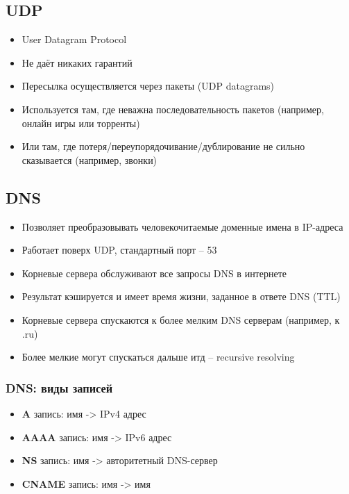   \subsection{UDP}
    \begin{itemize}
      \item User Datagram Protocol
      \item Не даёт никаких гарантий
      \item Пересылка осуществляется через пакеты (UDP datagrams)
      \item Используется там, где неважна последовательность пакетов (например, онлайн игры или торренты)
      \item Или там, где потеря/переупорядочивание/дублирование не сильно сказывается (например, звонки)
    \end{itemize}
  
  \subsection{DNS}
    \begin{itemize}
      \item Позволяет преобразовывать человекочитаемые доменные имена в IP-адреса
      \item Работает поверх UDP, стандартный порт – 53
      \item Корневые сервера обслуживают все запросы DNS в интернете
      \item Результат кэшируется и имеет время жизни, заданное в ответе DNS (TTL)
      \item Корневые сервера спускаются к более мелким DNS серверам (например, к .ru)
      \item Более мелкие могут спускаться дальше итд – recursive resolving
    \end{itemize}
  
  \subsubsection{DNS: виды записей}
    \begin{itemize}
      \item \textbf{A} запись: имя -> IPv4 адрес
      \item \textbf{AAAA} запись: имя -> IPv6 адрес
      \item \textbf{NS} запись: имя -> авторитетный DNS-сервер
      \item \textbf{CNAME} запись: имя -> имя
    \end{itemize}
  
